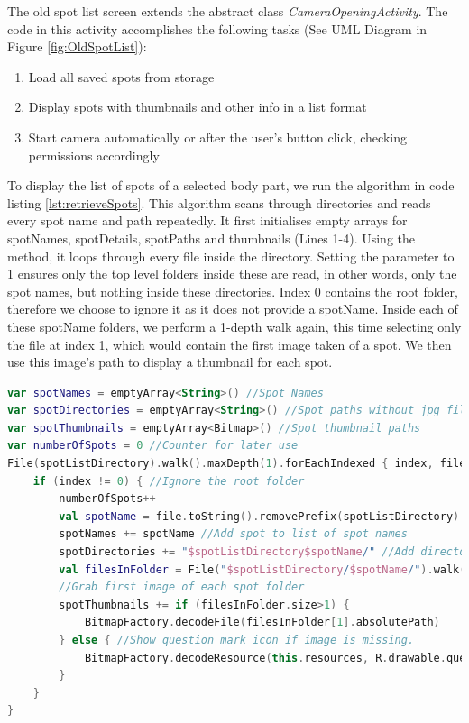The old spot list screen extends the abstract class \emph{CameraOpeningActivity}. The code in this activity accomplishes the following tasks (See UML Diagram in Figure \ref{fig:OldSpotList}):
\begin{enumerate}
    \item Load all saved spots from storage
    \item Display spots with thumbnails and other info in a list format
    \item Start camera automatically or after the user's button click, checking permissions accordingly
\end{enumerate}
To display the list of spots of a selected body part, we run the algorithm in code listing \ref{lst:retrieveSpots}. This algorithm scans through directories and reads every spot name and path repeatedly. It first initialises empty arrays for spotNames, spotDetails, spotPaths and thumbnails (Lines 1-4). Using the    method, it loops through every file inside the  directory. Setting the  parameter to 1 ensures only the top level folders inside these are read, in other words, only the spot names, but nothing inside these directories. Index 0 contains the root folder, therefore we choose to ignore it as it does not provide a spotName. Inside each of these spotName folders, we perform a 1-depth walk again, this time selecting only the file at index 1, which would contain the first image taken of a spot. We then use this image's path to display a thumbnail for each spot.

\clearpage
\begin{lstlisting}[caption={Loading Old Spots}, label={lst:retrieveSpots}, language=Kotlin]
var spotNames = emptyArray<String>() //Spot Names
var spotDirectories = emptyArray<String>() //Spot paths without jpg file
var spotThumbnails = emptyArray<Bitmap>() //Spot thumbnail paths
var numberOfSpots = 0 //Counter for later use
File(spotListDirectory).walk().maxDepth(1).forEachIndexed { index, file ->
    if (index != 0) { //Ignore the root folder
        numberOfSpots++
        val spotName = file.toString().removePrefix(spotListDirectory)
        spotNames += spotName //Add spot to list of spot names
        spotDirectories += "$spotListDirectory$spotName/" //Add directory
        val filesInFolder = File("$spotListDirectory/$spotName/").walk().maxDepth(1).toList()
        //Grab first image of each spot folder
        spotThumbnails += if (filesInFolder.size>1) {
            BitmapFactory.decodeFile(filesInFolder[1].absolutePath)
        } else { //Show question mark icon if image is missing.
            BitmapFactory.decodeResource(this.resources, R.drawable.questionmark)
        }
    }
}
\end{lstlisting}

